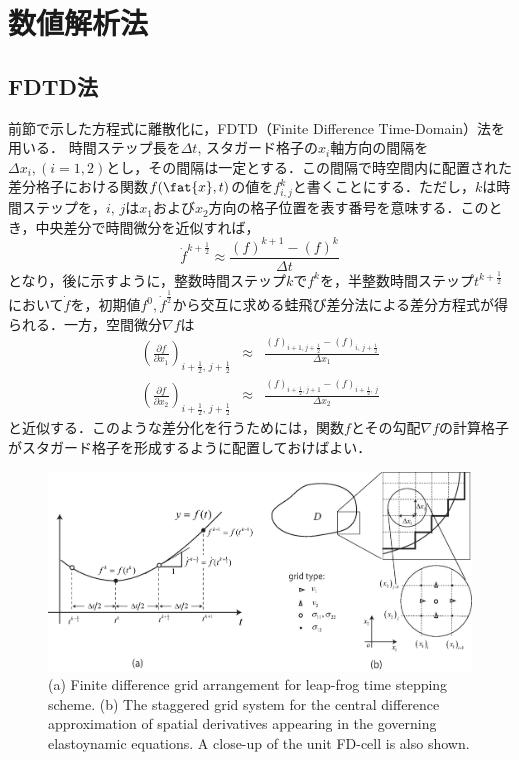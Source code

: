 ﻿%
\section{数値解析法}
\subsection{FDTD法}
前節で示した方程式に離散化に，FDTD（Finite Difference Time-Domain）法を用いる．
時間ステップ長を$\Delta t$, スタガード格子の$x_i$軸方向の間隔を
$\Delta x_i,(i=1,2)$とし，その間隔は一定とする．この間隔で時空間内に配置された差分格子における関数$f(\fat{x},t)$の値を$f^k_{i,j}$と書くことにする．ただし，$k$は時間ステップを，$i,\, j$は$x_1$および$x_2$方向の格子位置を表す番号を意味する．このとき，中央差分で時間微分を近似すれば，
\begin{equation}
	\dot{f}^{k+\frac{1}{2}} \approx \frac{ (f)^{k+1}-(f)^k}{\Delta t}
	\label{eqn:dfdt}
\end{equation}
となり，後に示すように，整数時間ステップ$k$で$f^k$を，半整数時間ステップ$t^{k+\frac{1}{2}}$において$\dot f$を，初期値$f^0, \dot f^{\frac{1}{2}}$から交互に求める蛙飛び差分法による差分方程式が得られる．一方，空間微分$\nabla f$は
\begin{eqnarray}
	\left( \frac{\partial f}{\partial x_1}\right)
	_{i+\frac{1}{2}, \, j+\frac{1}{2}}
	& \approx &
		\frac{\left(f\right)_{i+1,j+\frac{1}{2}} -\left(f\right)_{i,\, j+\frac{1}{2}}}
		{\Delta x_1}
	\label{eqn:dfdx1}
	\\
	\left( \frac{\partial f}{\partial x_2}\right)
	_{i+\frac{1}{2}, \, j+\frac{1}{2}}
	& \approx &
	\frac{\left(f\right)_{i+\frac{1}{2},j+1} -\left(f\right)_{i+\frac{1}{2},\, j}}{\Delta x_2}
	\label{eqn:dfdx2}
\end{eqnarray}
と近似する．このような差分化を行うためには，関数$f$とその勾配$\nabla f$の計算格子がスタガード格子を形成するように配置しておけばよい．
\begin{figure}[here]
     \begin{center}
     \includegraphics[width=1.0\linewidth]{Figs/FDgrid.eps}
     \end{center}
     \caption{ (a) Finite difference grid arrangement for leap-frog time stepping scheme.
	 (b) The staggered grid system for the central difference approximation 
		of spatial derivatives appearing in the governing elastoynamic 
		equations. A close-up of the unit FD-cell is also shown.
	}
     \label{fig:FDgrids}
\end{figure}
